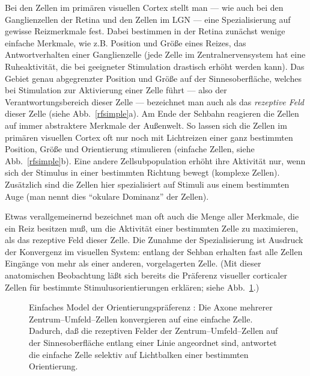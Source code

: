 Bei den Zellen im primären visuellen Cortex stellt man --- wie auch bei
den Ganglienzellen der Retina und den Zellen im LGN --- eine
Spezialisierung auf gewisse Reizmerkmale fest.  Dabei bestimmen in der
Retina zunächst wenige einfache Merkmale, wie z.B.  Position und Größe
eines Reizes, das Antwortverhalten einer Ganglienzelle (jede Zelle im
Zentralnervensystem hat eine Ruheaktivität, die bei geeigneter Stimulation
drastisch erhöht werden kann).  Das Gebiet genau abgegrenzter Position und
Größe auf der Sinnesoberfläche, welches bei Stimulation zur Aktivierung
einer Zelle führt --- also der Verantwortungsbereich dieser Zelle ---
bezeichnet man auch als das \emph{rezeptive Feld} dieser Zelle (siehe
Abb.~\ref{rfsimple}a).  Am Ende der Sehbahn reagieren die Zellen auf immer
abstraktere Merkmale der Außenwelt.  So lassen sich die Zellen im
primären visuellen Cortex oft nur noch mit Lichtreizen einer ganz
bestimmten Position, Größe und Orientierung stimulieren (einfache Zellen,
siehe Abb.~\ref{rfsimple}b).  Eine andere Zellsubpopulation erhöht ihre
Aktivität nur, wenn sich der Stimulus in einer bestimmten Richtung bewegt
(komplexe Zellen).  Zusätzlich sind die Zellen hier spezialisiert auf
Stimuli aus einem bestimmten Auge (man nennt dies ``okulare Dominanz'' der
Zellen).

Etwas verallgemeinernd bezeichnet man oft auch die Menge aller Merkmale,
die ein Reiz besitzen muß, um die Aktivität einer bestimmten Zelle zu
maximieren, als das rezeptive Feld dieser Zelle.  Die Zunahme der
Spezialisierung ist Ausdruck der Konvergenz im visuellen System: entlang
der Sehban erhalten fast alle Zellen Eingänge von mehr als einer anderen,
vorgelagerten Zelle. (Mit dieser anatomischen Beobachtung läßt sich
bereits die Präferenz visueller corticaler Zellen für bestimmte
Stimulusorientierungen erklären; siehe Abb.~\ref{opmodel}.)

\begin{figure}[p]
\begin{center}
\end{center}
\caption{Einfaches Model der Orientierungspräferenz \protect\cite{hubel:1962}:
Die Axone mehrerer Zentrum--Umfeld--Zellen konvergieren auf eine einfache
Zelle. Dadurch, daß die rezeptiven Felder der Zentrum--Umfeld--Zellen auf
der Sinnesoberfläche entlang einer Linie angeordnet sind, antwortet die
einfache Zelle selektiv auf Lichtbalken einer bestimmten Orientierung.}
\label{opmodel}
\end{figure}

